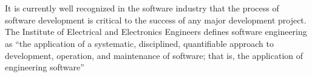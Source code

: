 \section{}

It is currently well recognized in the software industry that the process of software development 
is critical to the success of any major development project.
The Institute of Electrical and Electronics Engineers defines software engineering as 
“the application of a systematic, disciplined, quantifiable approach to development, 
operation, and maintenance of software; that is, the application of engineering software”

